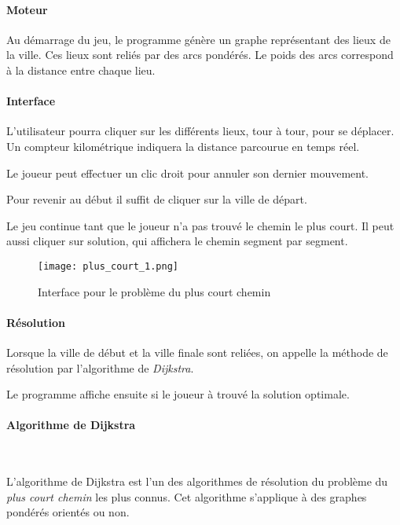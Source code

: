         \paragraph{Moteur}
            Au démarrage du jeu, le programme génère un graphe
            représentant des lieux de la ville. Ces lieux sont reliés par des arcs pondérés.
            Le poids des arcs correspond à la distance entre chaque lieu.

        \paragraph{Interface}

        L'utilisateur pourra cliquer sur les différents lieux, tour à tour,
        pour se déplacer. Un compteur kilométrique indiquera la
        distance parcourue en temps réel.

        Le joueur peut effectuer un clic droit pour annuler son dernier
        mouvement.

        Pour revenir au début il suffit de cliquer sur la ville de départ.

        Le jeu continue tant que le joueur n'a pas trouvé le chemin
        le plus court. Il peut aussi cliquer sur \og solution\fg, qui
        affichera le chemin segment par segment.

\begin{figure}[h]
\begin{center}
    \texttt{[image: plus\_court\_1.png]} 
    \caption{Interface pour le problème du plus court chemin}
\end{center}
\end{figure}

        \paragraph{Résolution}
            Lorsque la ville de début et la ville finale sont reliées,
            on appelle la méthode de résolution par l'algorithme de \emph{Dijkstra}.

            Le programme affiche ensuite si le joueur à trouvé la solution optimale.

		\paragraph{Algorithme de Dijkstra} ~

			L'algorithme de Dijkstra est l'un des algorithmes de résolution du problème du
			\emph{plus court chemin} les plus connus. Cet algorithme s'applique à des graphes pondérés orientés ou non.


